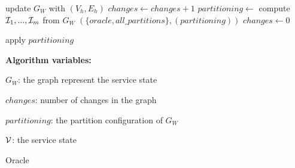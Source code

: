 \begin{algorithm}[ht!]
\begin{distribalgo}[1]
\vspace{1.0mm}

	\STATE update $G_W$ with $(V_h,E_h)$
	\STATE $changes \leftarrow changes + 1$
		\STATE $partitioning  \leftarrow$ compute $\mathcal{I}_1, ..., \mathcal{I}_m$ from $G_W$
		\STATE \amcast$(\{oracle, all\_partitions\}, (partitioning))$
		\STATE $changes \leftarrow 0$
	\ENDIF
\ENDINDENT

\vspace{1.0mm}

	\STATE apply $partitioning$
\ENDINDENT

\vspace{1.5mm}

\textbf{Algorithm variables:}

\vspace{1mm}

$G_W$: the graph represent the service state

$changes$: number of changes in the graph

$partitioning$: the partition configuration of $G_W$

$\mathcal{V}$: the service state


\caption{Oracle}
\label{alg:dynastar-oracle_proxy}
\end{distribalgo}
\end{algorithm}



